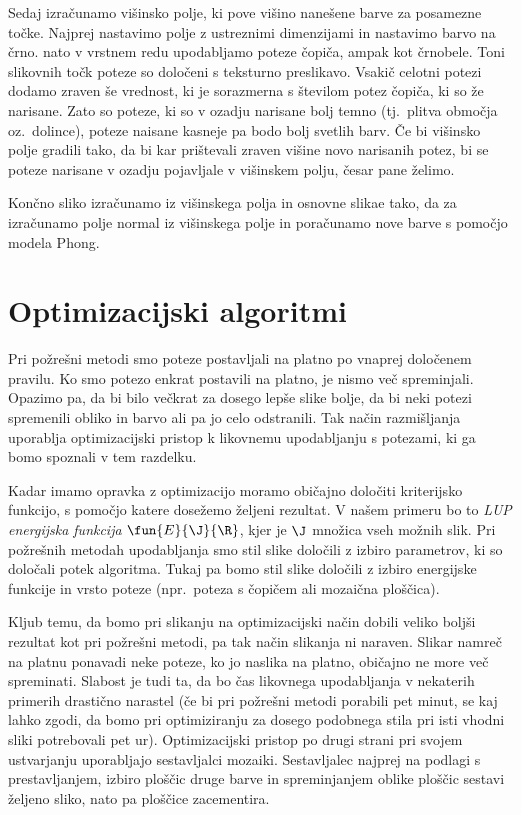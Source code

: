 Sedaj izračunamo višinsko polje, ki pove višino nanešene barve za posamezne točke. Najprej nastavimo polje z ustreznimi dimenzijami in nastavimo barvo na črno. nato v vrstnem redu upodabljamo poteze čopiča, ampak kot črnobele. Toni slikovnih točk poteze so določeni s teksturno preslikavo. Vsakič celotni potezi dodamo zraven še vrednost, ki je sorazmerna s številom potez čopiča, ki so že narisane. Zato so poteze, ki so v ozadju narisane bolj temno (tj.\ plitva območja oz.\ dolince), poteze naisane kasneje pa bodo bolj svetlih barv. Če bi višinsko polje gradili tako, da bi kar prištevali zraven višine novo narisanih potez, bi se poteze narisane v ozadju pojavljale v višinskem polju, česar pane želimo.

Končno sliko izračunamo iz višinskega polja in osnovne slikae tako, da za izračunamo polje normal iz višinskega polje in poračunamo nove barve s pomočjo modela Phong.
%

\section{Optimizacijski algoritmi}
%
Pri požrešni metodi smo poteze postavljali na platno po vnaprej določenem pravilu. Ko smo potezo enkrat postavili na platno, je nismo več spreminjali. Opazimo pa, da bi bilo večkrat za dosego lepše slike bolje, da bi neki potezi spremenili obliko in barvo ali pa jo celo odstranili. Tak način razmišljanja uporablja optimizacijski pristop k likovnemu upodabljanju s potezami, ki ga bomo spoznali v tem razdelku.

%
Kadar imamo opravka z optimizacijo moramo običajno določiti kriterijsko funkcijo, s pomočjo katere dosežemo željeni rezultat. V našem primeru bo to \emph{LUP energijska funkcija} $\fun{E}{\J}{\R}$, kjer je $\J$ množica vseh možnih slik. Pri požrešnih metodah upodabljanja smo stil slike določili z izbiro parametrov, ki so določali potek algoritma. Tukaj pa bomo stil slike določili z izbiro energijske funkcije in vrsto poteze (npr.\ poteza s čopičem ali mozaična ploščica).

%
Kljub temu, da bomo pri slikanju na optimizacijski način dobili veliko boljši rezultat kot pri požrešni metodi, pa tak način slikanja ni naraven. Slikar namreč na platnu ponavadi neke poteze, ko jo naslika na platno, običajno ne more več spreminati. Slabost je tudi ta, da bo čas likovnega upodabljanja v nekaterih primerih drastično narastel (če bi pri požrešni metodi porabili pet minut, se kaj lahko zgodi, da bomo pri optimiziranju za dosego podobnega stila pri isti vhodni sliki potrebovali pet ur). Optimizacijski pristop po drugi strani pri svojem ustvarjanju uporabljajo sestavljalci mozaiki. Sestavljalec najprej na podlagi s prestavljanjem, izbiro ploščic druge barve in spreminjanjem oblike ploščic sestavi željeno sliko, nato pa ploščice zacementira.

